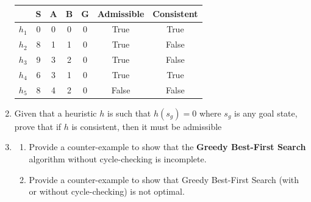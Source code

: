 \begin{enumerate}
\begin{table}[ht!]
        \begin{tabular}{||c|c|c|c|c|c|c||}
            \hline
                  & S & A & B & G & Admissible            & Consistent            \\ \hline \hline
            $h_1$ & 0 & 0 & 0 & 0 & \color{primary} True  & \color{primary} True  \\ \hline
            $h_2$ & 8 & 1 & 1 & 0 & \color{primary} True  & \color{primary} False \\ \hline
            $h_3$ & 9 & 3 & 2 & 0 & \color{primary} True  & \color{primary} False \\ \hline
            $h_4$ & 6 & 3 & 1 & 0 & \color{primary} True  & \color{primary} True  \\ \hline
            $h_5$ & 8 & 4 & 2 & 0 & \color{primary} False & \color{primary} False \\ \hline
        \end{tabular}
    \end{table}

    \item Given that a heuristic $h$ is such that $h(s_g) = 0$ where $s_g$ is any goal state, prove that if $h$ is consistent, then it must be admissible


    \item \begin{enumerate}[label=\alph*)]
        \item Provide a counter-example to show that the \textbf{Greedy Best-First Search} algorithm without cycle-checking is incomplete.

        \begin{solution}
        \end{solution}

        \item Provide a counter-example to show that Greedy Best-First Search (with or without cycle-checking) is not optimal.

    \end{enumerate}
\end{enumerate}